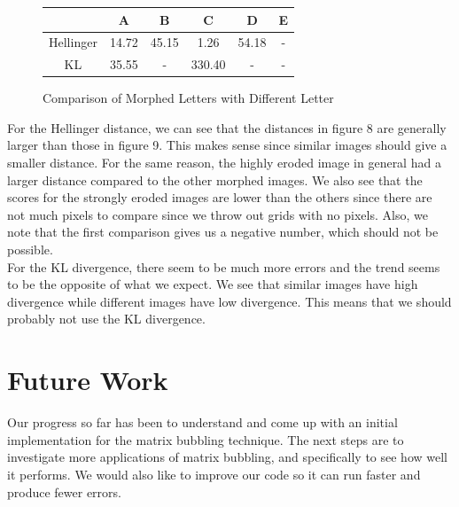 \documentclass{article}
\begin{document}
\begin{figure}[h!]
\begin{center}
  \begin{tabular}{ c || c | c | c | c | c }
     & A & B & C & D & E \\ \hline
    Hellinger & 14.72 & 45.15 & 1.26 & 54.18 & - \\
    KL & 35.55 & - & 330.40 & - & -
  \end{tabular}
  \caption{Comparison of Morphed Letters with Different Letter}
\end{center}
\end{figure}

For the Hellinger distance, we can see that the distances in figure 8 are
generally larger than those in figure 9. This makes sense since similar images
should give a smaller distance. For the same reason, the highly eroded image in
general had a larger distance compared to the other morphed images. We also see
that the scores for the strongly eroded images are lower than the others since
there are not much pixels to compare since we throw out grids with no pixels.
Also, we note that the first comparison gives us a negative number, which
should not be possible.\\

For the KL divergence, there seem to be much more errors and the trend seems to
be the opposite of what we expect. We see that similar images have high
divergence while different images have low divergence. This means that we
should probably not use the KL divergence.


\section{Future Work}

Our progress so far has been to understand and come up with an initial
implementation for the matrix bubbling technique. The next steps are to
investigate more applications of matrix bubbling, and specifically to see how
well it performs. We would also like to improve our code so it can run faster
and produce fewer errors.

\clearpage
\printbibliography
\end{document}
